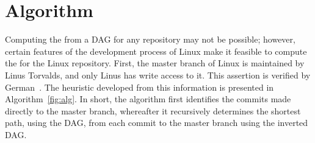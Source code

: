 \section{Algorithm}
\label{sec:algorithm}

Computing the \mt from a DAG for any repository may not be possible;
however, certain features of the development process of Linux make it
feasible to compute the \mt for the Linux repository. First, the master
branch of Linux is maintained by Linus Torvalds, and only Linus has
write access to it. This assertion is verified by
German~\cite{German2015}. The heuristic developed from this information
is presented in Algorithm~\ref{fig:alg}. In short, the algorithm first
identifies the commits made directly to the master branch, whereafter it
recursively determines the shortest path, using the DAG, from each
commit to the master branch using the inverted DAG\@.

